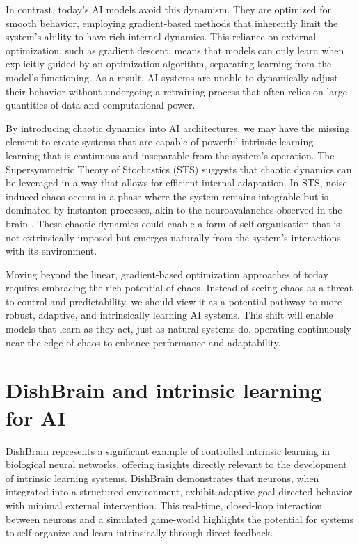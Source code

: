 \documentclass{article}
\begin{document}
In contrast, today's AI models avoid this dynamism. They are optimized
for smooth behavior, employing gradient-based methods
that inherently limit the system's ability to have rich internal dynamics. 
This reliance on external optimization, such as gradient descent, means that
models can only learn when explicitly guided by an optimization algorithm,
separating learning from the model's functioning. As a result,
AI systems are unable to dynamically adjust their behavior without undergoing
a retraining process that often relies on large quantities of data and computational power.

By introducing chaotic dynamics into AI architectures, we may have the missing element to
create systems that are capable of powerful intrinsic learning --- learning
that is continuous and inseparable from the system's operation. The
Supersymmetric Theory of Stochastics (STS) suggests that chaotic
dynamics can be leveraged in a way that allows for efficient internal adaptation.
In STS, noise-induced chaos occurs in a phase where the system remains integrable but is dominated
by instanton processes, akin to the neuroavalanches observed in the
brain \cite{ovchinnikov2021}. These chaotic dynamics could enable a form of
self-organisation that is not extrinsically imposed but emerges naturally
from the system's interactions with its environment.

Moving beyond the linear, gradient-based optimization approaches of
today requires embracing the rich potential of chaos. Instead of seeing
chaos as a threat to control and predictability, we should view it as a
potential pathway to more robust, adaptive, and intrinsically learning
AI systems. This shift will enable models that learn as they act, just
as natural systems do, operating continuously near the edge of chaos to
enhance performance and adaptability.


\section{DishBrain and intrinsic learning for AI}

DishBrain \cite{Kagan2022} represents a significant example of
controlled intrinsic learning in biological neural networks, offering
insights directly relevant to the development of intrinsic learning
systems. DishBrain demonstrates that neurons, when integrated into a
structured environment, exhibit adaptive goal-directed behavior with
minimal external intervention. This real-time, closed-loop interaction
between neurons and a simulated game-world highlights the potential for
systems to self-organize and learn intrinsically through direct feedback.
\end{document}
